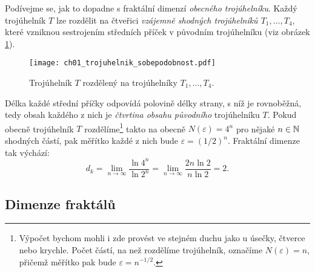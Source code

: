 \begin{example}\label{ex:fraktalni-dimenze-trojuhelnik}
    Podívejme se, jak to dopadne s fraktální dimenzí \emph{obecného trojúhelníku}. Každý trojúhelník $T$ lze rozdělit na čtveřici \emph{vzájemně shodných trojúhelníků $T_1,\dots,T_4$}, které vzniknou sestrojením středních příček v původním trojúhelníku (viz obrázek \ref{fig:trojuhelnik-sobepodobnost}).
    \begin{figure}[h]
        \centering
        \texttt{[image: ch01\_trojuhelnik\_sobepodobnost.pdf]}
        \caption{Trojúhelník $T$ rozdělený na trojúhelníky $T_1,\dots,T_4$.}
        \label{fig:trojuhelnik-sobepodobnost}
    \end{figure}
    Délka každé střední příčky odpovídá polovině délky strany, s níž je rovnoběžná, tedy obsah každého z nich je \emph{čtvrtina obsahu původního} trojúhelníku $T$. Pokud obecně trojúhelník $T$ rozdělíme\footnote{Výpočet bychom mohli i zde provést ve stejném duchu jako u úsečky, čtverce nebo krychle. Počet částí, na než rozdělíme trojúhelník, označíme $N(\varepsilon)=n$, přičemž měřítko pak bude $\varepsilon=n^{-1/2}$.} takto na obecně $N(\varepsilon)=4^n$ pro nějaké $n\in\mathbb{N}$ shodných částí, pak měřítko každé z nich bude $\varepsilon=(1/2)^n$. Fraktální dimenze tak výchází:
    \[d_k=\lim_{n\to\infty}{\dfrac{\ln{4^n}}{\ln{2^n}}}=\lim_{n\to\infty}{\dfrac{2n\ln{2}}{n\ln{2}}}=2.\]
\end{example}

\subsection{Dimenze fraktálů}\label{subsec:dimenze-fraktalu}

